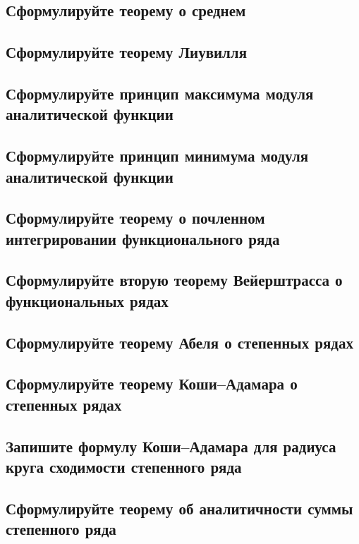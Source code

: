 \subsection{Сформулируйте теорему о среднем}

\subsection{Сформулируйте теорему Лиувилля}

\subsection{Сформулируйте принцип максимума модуля аналитической функции}

\subsection{Сформулируйте принцип минимума модуля аналитической функции}

\subsection{Сформулируйте теорему о почленном интегрировании функционального ряда}

\subsection{Сформулируйте вторую теорему Вейерштрасса о функциональных рядах}

\subsection{Сформулируйте теорему Абеля о степенных рядах}

\subsection{Сформулируйте теорему Коши–Адамара о степенных рядах}

\subsection{Запишите формулу Коши–Адамара для радиуса круга сходимости степенного ряда}

\subsection{Сформулируйте теорему об аналитичности суммы степенного ряда}

